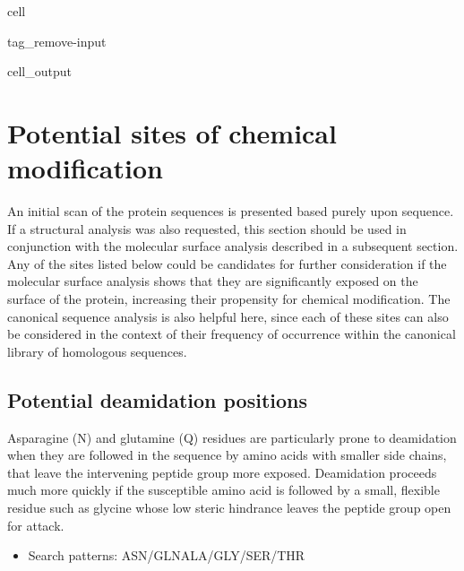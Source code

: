 \documentclass[letterpaper,10pt,english]{jupyterBook}
\begin{document}
\begin{sphinxuseclass}{cell}
\begin{sphinxuseclass}{tag_remove-input}\begin{sphinxVerbatimOutput}

\begin{sphinxuseclass}{cell_output}
\noindent{}

\end{sphinxuseclass}\end{sphinxVerbatimOutput}

\end{sphinxuseclass}
\end{sphinxuseclass}

\section{Potential sites of chemical modification}
\label{\detokenize{ipynb/chapter1:potential-sites-of-chemical-modification}}
\sphinxAtStartPar
An initial scan of the protein sequences is presented based purely upon sequence. If a structural analysis was also requested, this section should be used in conjunction with the molecular surface analysis described in a subsequent section. Any of the sites listed below could be candidates for further consideration if the molecular surface analysis shows that they are significantly exposed on the surface of the protein, increasing their propensity for chemical modification. The canonical sequence analysis is also helpful here, since each of these sites can also be considered in the context of their frequency of occurrence within the canonical library of homologous sequences.


\subsection{Potential deamidation positions}
\label{\detokenize{ipynb/chapter1:potential-deamidation-positions}}
\sphinxAtStartPar
Asparagine (N) and glutamine (Q) residues are particularly prone to deamidation when they are followed in the sequence by amino acids with smaller side chains, that leave the intervening peptide group more exposed. Deamidation proceeds much more quickly if the susceptible amino acid is followed by a small, flexible residue such as glycine whose low steric hindrance leaves the peptide group open for attack.
\begin{itemize}
\item {} 
\sphinxAtStartPar
Search patterns: ASN/GLN\sphinxhyphen{}ALA/GLY/SER/THR

\end{itemize}
\end{document}
